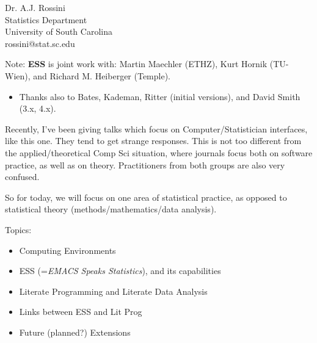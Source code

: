 \documentclass[semhelv]{seminar}
\begin{document}
\begin{slide}

  \begin{center}
    Dr. A.J. Rossini \\
    Statistics Department \\
    University of South Carolina \\
    rossini@stat.sc.edu \\
  \end{center}
  
  Note: \textbf{ESS} is joint work with: Martin Maechler (ETHZ), Kurt
  Hornik (TU-Wien), and Richard M. Heiberger (Temple).
\end{slide}

\begin{itemize}
\item Thanks also to Bates, Kademan, Ritter (initial versions), and
  David Smith (3.x, 4.x).
\end{itemize}

Recently, I've been giving talks which focus on Computer/Statistician
interfaces, like this one.  They tend to get strange responses.  This
is not too different from the applied/theoretical Comp Sci situation,
where journals focus both on software practice, as well as on theory.
Practitioners from both groups are also very confused.

So for today, we will focus on one area of statistical practice, as
opposed to statistical theory (methods/mathematics/data analysis).

\begin{slide}
  
  Topics:
  \begin{itemize}
  \item Computing Environments
  \item ESS (=\emph{EMACS Speaks Statistics}), and its capabilities
  \item Literate Programming and Literate Data Analysis
  \item Links between ESS and Lit Prog
  \item Future (planned?) Extensions
  \end{itemize}

\end{slide}
\end{document}
